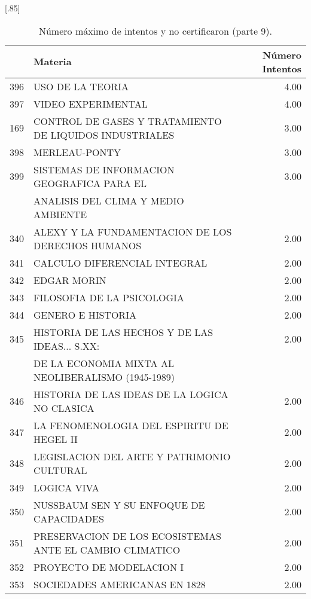 \documentclass[12pt]{article}
\begin{document}
\begin{table}[ht]
\centering
\scalebox{0.75}[.85]{
\begin{tabular}{rlr}
  \hline
 & Materia & N\'umero Intentos \\ 
  \hline
  396 & USO DE LA TEORIA & 4.00 \\ 
  397 & VIDEO EXPERIMENTAL & 4.00 \\ 
169 & CONTROL DE GASES Y TRATAMIENTO DE LIQUIDOS INDUSTRIALES & 3.00 \\ 
  398 & MERLEAU-PONTY & 3.00 \\ 
  399 & SISTEMAS DE INFORMACION GEOGRAFICA PARA EL & 3.00 \\ 
   & ANALISIS DEL CLIMA Y MEDIO AMBIENTE & \\ 
  340 & ALEXY Y LA FUNDAMENTACION DE LOS DERECHOS HUMANOS & 2.00 \\ 
  341 & CALCULO DIFERENCIAL INTEGRAL & 2.00 \\ 
  342 & EDGAR MORIN & 2.00 \\ 
  343 & FILOSOFIA DE LA PSICOLOGIA & 2.00 \\ 
  344 & GENERO E HISTORIA & 2.00 \\ 
  345 & HISTORIA DE LAS HECHOS Y DE LAS IDEAS... S.XX: & 2.00 \\ 
   & DE LA ECONOMIA MIXTA AL NEOLIBERALISMO (1945-1989) &  \\ 
  346 & HISTORIA DE LAS IDEAS DE LA LOGICA NO CLASICA & 2.00 \\ 
  347 & LA FENOMENOLOGIA DEL ESPIRITU DE HEGEL II & 2.00 \\ 
  348 & LEGISLACION DEL ARTE Y PATRIMONIO CULTURAL & 2.00 \\ 
  349 & LOGICA VIVA & 2.00 \\ 
  350 & NUSSBAUM SEN Y SU ENFOQUE DE CAPACIDADES & 2.00 \\ 
  351 & PRESERVACION DE LOS ECOSISTEMAS ANTE EL CAMBIO CLIMATICO & 2.00 \\ 
  352 & PROYECTO DE MODELACION I & 2.00 \\ 
  353 & SOCIEDADES AMERICANAS EN 1828 & 2.00 \\ 
   \hline
\end{tabular}}
\caption{\label{Num_Max_Intentos_Nunca_Cert_9} N\'umero m\'aximo de intentos y no certificaron (parte 9).}
\end{table}
\end{document}
